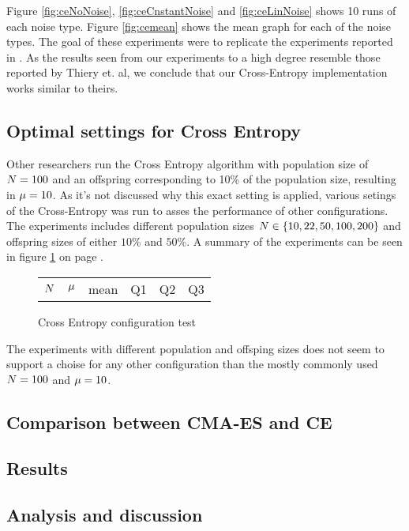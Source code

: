 Figure \ref{fig:ceNoNoise}, \ref{fig:ceCnstantNoise} and
\ref{fig:ceLinNoise} shows 10 runs of each noise type. Figure
\ref{fig:cemean} shows the mean graph for each of the noise types.
The goal of these experiments were to replicate the experiments 
reported in \citep{thiery:09}. As the results seen from our experiments
to a high degree resemble those reported by Thiery et. al, we conclude
that our Cross-Entropy implementation works similar to theirs.

\subsection{Optimal settings for Cross Entropy}

Other researchers run the Cross Entropy algorithm with population size of
$N = 100$ and an offspring corresponding to 10\% of 
the population size, resulting in $\mu = 10$. As it's not 
discussed why this exact setting is applied, various setings of the 
Cross-Entropy was run to asses the performance of other configurations.
The experiments includes different population sizes 
$N \in \{10, 22, 50, 100, 200\}$ and offspring 
sizes of either $10\%$ and $50\%$. 
A summary of the experiments can be seen in figure \ref{CEConfigTest}
on page \pageref{CEConfigTest}.

\begin{figure}[H]
\centering
\begin{tabular}{l l l l l l}
$N$ & $\mu$ & mean & Q1 & Q2 & Q3
\end{tabular}
\caption{Cross Entropy configuration test \label{CEConfigTest}}
\end{figure}

The experiments with different population and offsping sizes
does not seem to support a choise for any other configuration 
than the mostly commonly used 
$N = 100$ and $\mu = 10$.

\subsection{Comparison between CMA-ES and CE}


\subsection{Results}


\subsection{Analysis and discussion}


